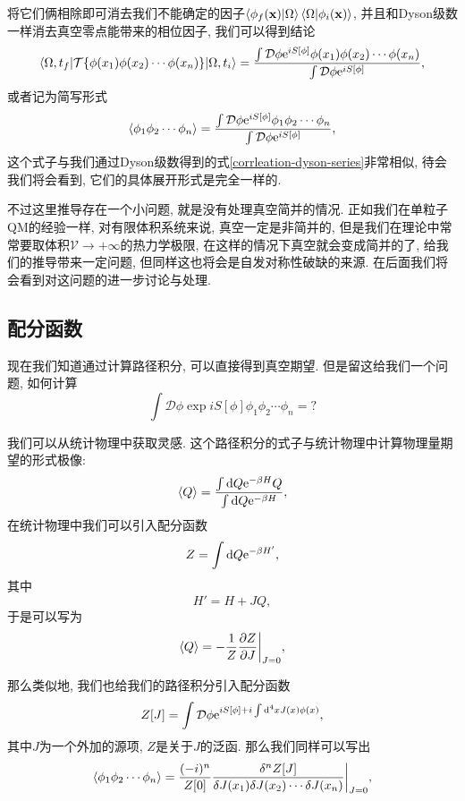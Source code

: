 将它们俩相除即可消去我们不能确定的因子$\braket{\phi_f(\mathbf{x})|\Omega}\braket{\Omega|\phi_i(\mathbf{x})}$, 并且和Dyson级数一样消去真空零点能带来的相位因子, 我们可以得到结论
\begin{equation}
    \braket{\Omega, t_f|\mathcal T\{\phi(x_1)\phi(x_2)\cdots\phi(x_n)\}|\Omega, t_i}=\frac{\int\mathcal D\phi\mathrm e^{iS[\phi]}\phi(x_1)\phi(x_2)\cdots\phi(x_n)}{\int\mathcal D\phi\mathrm e^{iS[\phi]}},
\end{equation}
或者记为简写形式
\begin{equation}
    \braket{\phi_1\phi_2\cdots\phi_n}=\frac{\int\mathcal D\phi\mathrm e^{iS[\phi]}\phi_1\phi_2\cdots\phi_n}{\int\mathcal D\phi\mathrm e^{iS[\phi]}},
\end{equation}
这个式子与我们通过Dyson级数得到的式\eqref{corrleation-dyson-series}非常相似, 待会我们将会看到, 它们的具体展开形式是完全一样的.

不过这里推导存在一个小问题, 就是没有处理真空简并的情况. 正如我们在单粒子QM的经验一样, 对有限体积系统来说, 真空一定是非简并的, 但是我们在理论中常常要取体积$\mathcal V\to+\infty$的热力学极限, 在这样的情况下真空就会变成简并的了, 给我们的推导带来一定问题, 但同样这也将会是自发对称性破缺的来源. 在后面我们将会看到对这问题的进一步讨论与处理.

\subsection{配分函数}
现在我们知道通过计算路径积分, 可以直接得到真空期望. 但是留这给我们一个问题, 如何计算
\begin{equation}
    \int\mathcal D\phi\exp{iS[\phi]}\phi_1\phi_2\cdots\phi_n=?
\end{equation}

我们可以从统计物理中获取灵感. 这个路径积分的式子与统计物理中计算物理量期望的形式极像:
\begin{equation}
    \braket{Q}=\frac{\int\mathrm d Q\mathrm e^{-\beta H}Q}{\int\mathrm d Q\mathrm e^{-\beta H}},
\end{equation}
在统计物理中我们可以引入配分函数
\begin{equation}
    Z=\int\mathrm d Q\mathrm e^{-\beta H'},
\end{equation}
其中
\begin{equation}
    H'=H+JQ,
\end{equation}
于是可以写为
\begin{equation}
    \braket{Q}=-\frac1Z\frac{\partial Z}{\partial J}\bigg|_{J=0},
\end{equation}

那么类似地, 我们也给我们的路径积分引入配分函数
\begin{equation}
    Z[J]=\int\mathcal D\phi\mathrm e^{iS[\phi]+i\int\mathrm d^4xJ(x)\phi(x)},
\end{equation}
其中$J$为一个外加的源项, $Z$是关于$J$的泛函. 那么我们同样可以写出
\begin{equation}
    \braket{\phi_1\phi_2\cdots\phi_n}=\frac{(-i)^n}{Z[0]}\frac{\delta^n Z[J]}{\delta J(x_1)\delta J(x_2)\cdots\delta J(x_n)}\bigg|_{J=0},
\end{equation}

